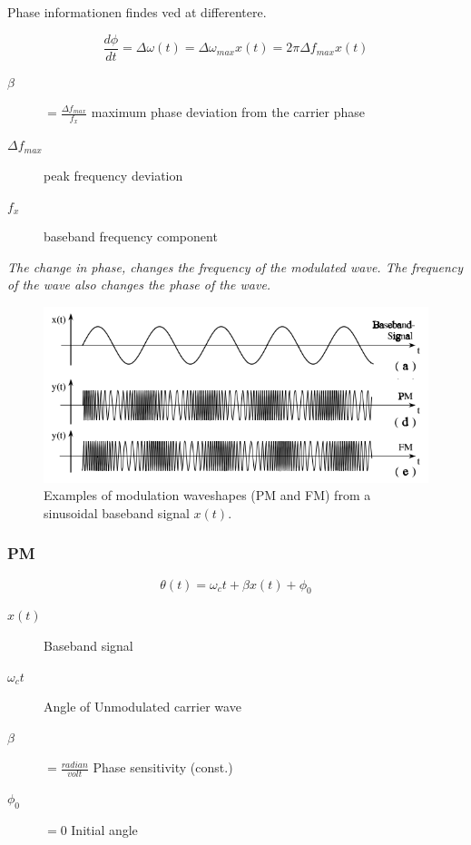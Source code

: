 Phase informationen findes ved at differentere.

\begin{equation}\label{eq:FMphi}
\dfrac{d\phi}{dt} = \Delta \omega(t)=\Delta\omega_{max}x(t)=2\pi\Delta f_{max}x(t)
\end{equation}

\begin{description}
	\item[$\beta$] $=\frac{\Delta f_{max}}{f_x}$ maximum phase deviation from the carrier phase
	\item[$\Delta f_{max}$] peak frequency deviation
	\item[$f_x$] baseband frequency component
\end{description}

\textit{The change in phase, changes the frequency of the modulated wave. The frequency of the wave also changes the phase of the wave.}

\begin{figure} [H]
	\centering
	\includegraphics[width=\linewidth]{graphics/8.png}
	\caption{Examples of modulation waveshapes (PM and FM) from a sinusoidal baseband signal $x(t)$.}
	\label{fig:8}
\end{figure}

\subsubsection{PM}
\begin{equation}\label{eq:PM1}
\theta(t) =\omega_c t +\beta x(t)+\phi_0
\end{equation}

\begin{description}
	\item[$x(t)$] Baseband signal
	\item[$\omega_c t$] Angle of Unmodulated carrier wave
	\item[$\beta$]$=\frac{radian}{volt}$ Phase sensitivity (const.)
	\item[$\phi_0$] $=0$ Initial angle
\end{description}

